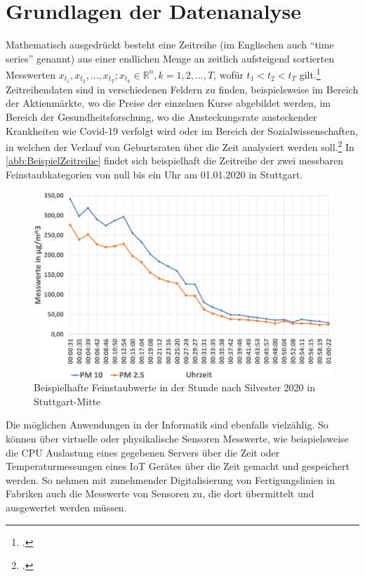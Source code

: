 \section{Grundlagen der Datenanalyse}\label{chap:GrundlagenDatenanalyse}

Mathematisch ausgedrückt besteht eine Zeitreihe (im Englischen auch \enquote{time series} genannt) aus einer endlichen Menge an zeitlich aufsteigend sortierten Messwerten $x_{t_1},x_{t_2},...,x_{t_T};  x_{t_k} \in \mathbb{R}^n, k=1,2,...,T$, wofür $t_1 < t_2 < t_T $ gilt.\footcite[Vgl.][1]{Deistler.2018b} 
Zeitreihendaten sind in verschiedenen Feldern zu finden, beispielsweise im Bereich der Aktienmärkte, wo die Preise der einzelnen Kurse abgebildet werden, im Bereich der Gesundheitsforschung, wo die Ansteckungsrate ansteckender Krankheiten wie Covid-19 verfolgt wird oder im Bereich der Sozialwissenschaften, in welchen der Verlauf von Geburtsraten über die Zeit analysiert werden soll.\footcite[Vgl.][1]{Shumway.2017b} 
In \autoref{abb:BeispielZeitreihe} findet sich beispielhaft die Zeitreihe der zwei messbaren Feinstaubkategorien von null bis ein Uhr am 01.01.2020 in Stuttgart.

\begin{figure}[H]
\centering
\includegraphics[width=\textwidth]{graphics/Feinstaub-Stuttgart.png}
\caption{Beispielhafte Feinstaubwerte in der Stunde nach Silvester 2020 in Stuttgart-Mitte}
\label{abb:BeispielZeitreihe}
\end{figure}

Die möglichen Anwendungen in der Informatik sind ebenfalls vielzählig. So können über virtuelle oder physikalische Sensoren Messwerte, wie beispielsweise die CPU Auslastung eines gegebenen Servers über die Zeit oder Temperaturmessungen eines \ac{IoT} Gerätes über die Zeit gemacht und gespeichert werden. So nehmen mit zunehmender Digitalisierung von Fertigungslinien in Fabriken auch die Messwerte von Sensoren zu, die dort übermittelt und ausgewertet werden müssen.

